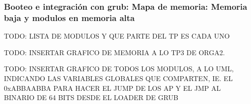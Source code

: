 	\subsubsection{Booteo e integración con grub: Mapa de memoria: Memoria baja y modulos en memoria alta}

		TODO: LISTA DE MODULOS Y QUE PARTE DEL TP ES CADA UNO

		TODO: INSERTAR GRAFICO DE MEMORIA A LO TP3 DE ORGA2.

		TODO: INSERTAR GRAFICO DE TODOS LOS MODULOS, A LO UML, INDICANDO LAS VARIABLES GLOBALES QUE COMPARTEN,
		IE. EL 0xABBAABBA PARA HACER EL JUMP DE LOS AP Y EL JMP AL BINARIO DE 64 BITS DESDE EL LOADER DE GRUB
